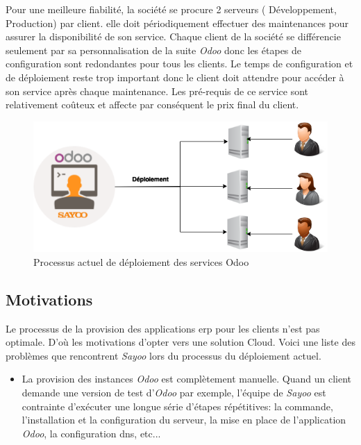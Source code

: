 \begin{onehalfspace}
Pour une meilleure fiabilité, la société se procure 2 serveurs ( Développement, Production) par client. elle doit périodiquement effectuer des maintenances pour assurer la disponibilité de son service. Chaque client de la société se différencie seulement par sa personnalisation de la suite \emph{Odoo} donc les étapes de configuration sont redondantes pour tous les clients. Le temps de configuration et de déploiement reste trop important donc le client doit attendre pour accéder à son service après chaque maintenance. Les pré-requis de ce service sont relativement coûteux et affecte par conséquent le prix final du client.
  


\begin{figure}[H]
\centering
\includegraphics [scale=0.7]{chapitre1/assets/sayoo1}
\caption{Processus actuel de déploiement des services Odoo}
\label{fig:}
\end{figure}






\subsection{Motivations}

Le processus de la provision des applications \acrshort{erp} pour les clients n'est pas optimale. D'où les motivations d'opter vers une solution Cloud. Voici une liste des problèmes que rencontrent \emph{Sayoo} lors du processus du déploiement actuel.

\begin{itemize}

\item La provision des instances \emph{Odoo} est complètement manuelle. Quand un client demande une version de test d'\emph{Odoo} par exemple, l'équipe de \emph{Sayoo} est contrainte d'exécuter une longue série d'étapes répétitives: la commande, l'installation et la configuration du serveur, la mise en place de l'application \emph{Odoo}, la configuration \acrshort{dns}, etc...


\end{itemize}
\end{onehalfspace}
